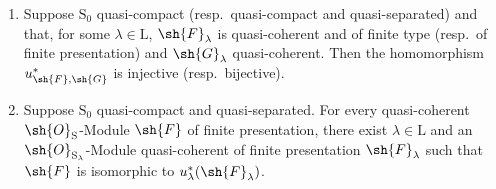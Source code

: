 \begin{theorem}[8.5.2]
\label{IV.8.5.2}
\begin{enumerate}[label=(\roman*)]
  \item Suppose $\mathrm{S}_0$ quasi-compact (resp.\ quasi-compact and quasi-separated) and that, for some $\lambda\in\mathrm{L}$, $\sh{F}_\lambda$ is quasi-coherent and of finite type (resp.\ of finite presentation) and $\sh{G}_\lambda$ quasi-coherent.
Then the homomorphism $u_{\sh{F},\sh{G}}^*$ is injective (resp.\ bijective).
  \item Suppose $\mathrm{S}_0$ quasi-compact and quasi-separated.
For every quasi-coherent $\sh{O}_\mathrm{S}$-Module $\sh{F}$ of finite presentation, there exist $\lambda\in\mathrm{L}$ and an $\sh{O}_{\mathrm{S}_\lambda}$-Module quasi-coherent of finite presentation $\sh{F}_\lambda$ such that $\sh{F}$ is isomorphic to $u_\lambda^*(\sh{F}_\lambda)$.
\end{enumerate}
\end{theorem}

